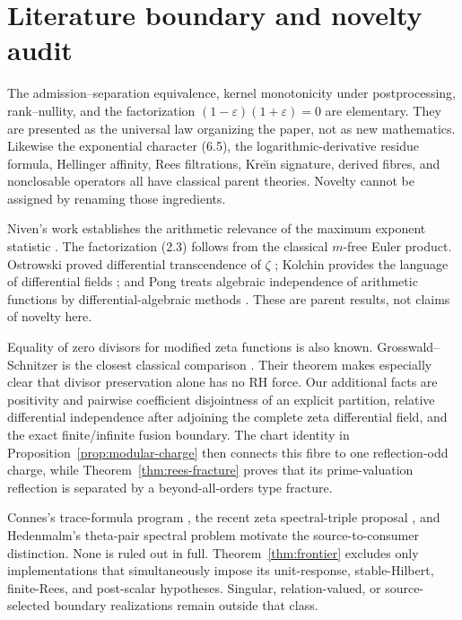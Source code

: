 \documentclass[11pt]{article}
\theoremstyle{definition}
\theoremstyle{remark}
\begin{document}
\section{Literature boundary and novelty audit}

The admission--separation equivalence, kernel monotonicity under postprocessing, rank--nullity,
and the factorization $(1-\varepsilon)(1+\varepsilon)=0$ are elementary.  They are presented as
the universal law organizing the paper, not as new mathematics.  Likewise the exponential
character (6.5), the logarithmic-derivative residue formula, Hellinger affinity, Rees filtrations,
Kre\u\i n signature, derived fibres, and nonclosable operators all have classical parent theories.
Novelty cannot be assigned by renaming those ingredients.

Niven's work establishes the arithmetic relevance of the maximum exponent statistic
\cite{Niven1969}.  The factorization (2.3) follows from the classical $m$-free Euler product.
Ostrowski proved differential transcendence of $\zeta$ \cite{Ostrowski1920}; Kolchin provides the
language of differential fields \cite{Kolchin1973}; and Pong treats algebraic independence of
arithmetic functions by differential-algebraic methods \cite{Pong2016}.  These are parent results,
not claims of novelty here.

Equality of zero divisors for modified zeta functions is also known.  Grosswald--Schnitzer is the
closest classical comparison \cite{GrosswaldSchnitzer1978}.  Their theorem makes especially clear
that divisor preservation alone has no RH force.  Our additional facts are positivity and
pairwise coefficient disjointness of an explicit partition, relative differential independence
after adjoining the complete zeta differential field, and the exact finite/infinite fusion
boundary.  The chart identity in Proposition~\ref{prop:modular-charge} then connects this fibre to
one reflection-odd charge, while Theorem~\ref{thm:rees-fracture} proves that its prime-valuation
reflection is separated by a beyond-all-orders type fracture.

Connes's trace-formula program \cite{Connes1999}, the recent zeta spectral-triple proposal
\cite{ConnesConsaniMoscovici2025}, and Hedenmalm's theta-pair spectral problem
\cite{Hedenmalm2026} motivate the source-to-consumer distinction.  None is ruled out in full.
Theorem~\ref{thm:frontier} excludes only implementations that simultaneously impose its
unit-response, stable-Hilbert, finite-Rees, and post-scalar hypotheses.  Singular,
relation-valued, or source-selected boundary realizations remain outside that class.
\end{document}

